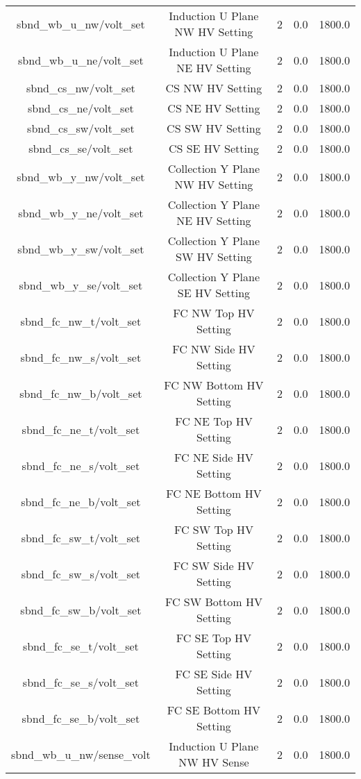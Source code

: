 \begin{center}
\begin{longtable}{c | c c c c }
sbnd\_wb\_u\_nw/volt\_set & Induction U Plane NW HV Setting & 2 & 0.0 & 1800.0\\ 
sbnd\_wb\_u\_ne/volt\_set & Induction U Plane NE HV Setting & 2 & 0.0 & 1800.0\\ 
sbnd\_cs\_nw/volt\_set & CS NW HV Setting & 2 & 0.0 & 1800.0\\ 
sbnd\_cs\_ne/volt\_set & CS NE HV Setting & 2 & 0.0 & 1800.0\\ 
sbnd\_cs\_sw/volt\_set & CS SW HV Setting & 2 & 0.0 & 1800.0\\ 
sbnd\_cs\_se/volt\_set & CS SE HV Setting & 2 & 0.0 & 1800.0\\ 
sbnd\_wb\_y\_nw/volt\_set & Collection Y Plane NW HV Setting & 2 & 0.0 & 1800.0\\ 
sbnd\_wb\_y\_ne/volt\_set & Collection Y Plane NE HV Setting & 2 & 0.0 & 1800.0\\ 
sbnd\_wb\_y\_sw/volt\_set & Collection Y Plane SW HV Setting & 2 & 0.0 & 1800.0\\ 
sbnd\_wb\_y\_se/volt\_set & Collection Y Plane SE HV Setting & 2 & 0.0 & 1800.0\\ 
sbnd\_fc\_nw\_t/volt\_set & FC NW Top HV Setting & 2 & 0.0 & 1800.0\\ 
sbnd\_fc\_nw\_s/volt\_set & FC NW Side HV Setting & 2 & 0.0 & 1800.0\\ 
sbnd\_fc\_nw\_b/volt\_set & FC NW Bottom HV Setting & 2 & 0.0 & 1800.0\\ 
sbnd\_fc\_ne\_t/volt\_set & FC NE Top HV Setting & 2 & 0.0 & 1800.0\\ 
sbnd\_fc\_ne\_s/volt\_set & FC NE Side HV Setting & 2 & 0.0 & 1800.0\\ 
sbnd\_fc\_ne\_b/volt\_set & FC NE Bottom HV Setting & 2 & 0.0 & 1800.0\\ 
sbnd\_fc\_sw\_t/volt\_set & FC SW Top HV Setting & 2 & 0.0 & 1800.0\\ 
sbnd\_fc\_sw\_s/volt\_set & FC SW Side HV Setting & 2 & 0.0 & 1800.0\\ 
sbnd\_fc\_sw\_b/volt\_set & FC SW Bottom HV Setting & 2 & 0.0 & 1800.0\\ 
sbnd\_fc\_se\_t/volt\_set & FC SE Top HV Setting & 2 & 0.0 & 1800.0\\ 
sbnd\_fc\_se\_s/volt\_set & FC SE Side HV Setting & 2 & 0.0 & 1800.0\\ 
sbnd\_fc\_se\_b/volt\_set & FC SE Bottom HV Setting & 2 & 0.0 & 1800.0\\ 
sbnd\_wb\_u\_nw/sense\_volt & Induction U Plane NW HV Sense & 2 & 0.0 & 1800.0\\ 

\end{longtable}
\end{center}
